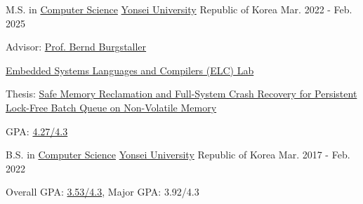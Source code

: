

\begin{cventries}

  \cventry
    {M.S. in \href{https://cs.yonsei.ac.kr/index.php}{Computer Science}} %
    {\href{https://www.yonsei.ac.kr/sc/index.jsp}{Yonsei University}} %
    {Republic of Korea} %
    {Mar. 2022 - Feb. 2025} %
    {
      \begin{cvitems} %
        \item {Advisor: \href{https://cs.yonsei.ac.kr/bbs/board.php?bo_table=sub2_1_a&wr_id=18}{Prof. Bernd Burgstaller}}
        \item {\href{https://elc.yonsei.ac.kr}{Embedded Systems Languages and Compilers (ELC) Lab}}
        \item {Thesis: \href{https://drive.google.com/file/d/17SAS2z-aPMT6cZKkqvQPJ1lqxeYCWS7l/view?usp=sharing}{Safe Memory Reclamation and Full-System Crash Recovery for Persistent Lock-Free Batch Queue on Non-Volatile Memory}}
        \item {GPA: \href{https://drive.google.com/file/d/1p5EAixYWCerQ1rd1fb-1V0mppF3Dal0N/view?usp=sharing}{4.27/4.3}}
      \end{cvitems}
    }

  \cventry
    {B.S. in \href{https://cs.yonsei.ac.kr/index.php}{Computer Science}} %
    {\href{https://www.yonsei.ac.kr/sc/index.jsp}{Yonsei University}} %
    {Republic of Korea} %
    {Mar. 2017 - Feb. 2022} %
    {
      \begin{cvitems} %
        \item {Overall GPA: \href{https://drive.google.com/file/d/1g-O5m43w4wgwSG9iAbFg4uPoqe1EhkWh/view?usp=sharing}{3.53/4.3}, Major GPA: 3.92/4.3}
      \end{cvitems}
    }
\end{cventries}

